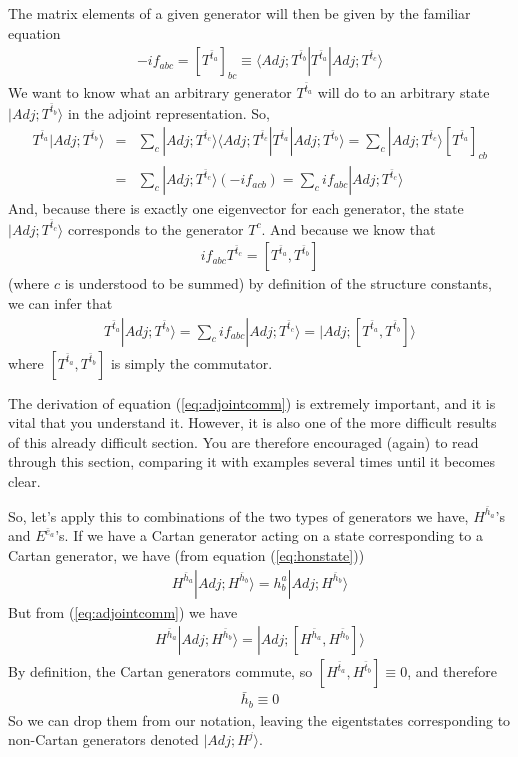 \documentclass[12pt,epsf]{article}
\def\nolabel{\nonumber }
\def\nolabel{\nonumber }
\begin{document}
The matrix elements of a given generator will then be given by the
familiar equation 
\begin{eqnarray}
-if_{abc} = [T^{\bar t_a}]_{bc} \equiv \langle Adj;T^{\bar t_b}|T^{\bar
t_a}|Adj;T^{\bar t_c}\rangle\nolabel
\end{eqnarray}
We want to know what an arbitrary generator $T^{\bar t_a}$ will do to
an arbitrary state $|Adj;T^{\bar t_b}\rangle$ in the adjoint
representation.  So,
\begin{eqnarray}
T^{\bar t_a}|Adj;T^{\bar t_b}\rangle &=& \sum_c |Adj;T^{\bar
t_c}\rangle \langle Adj; T^{\bar t_c}|T^{\bar t_a}|Adj;T^{\bar
t_b}\rangle = \sum_c|Adj;T^{\bar t_c}\rangle [T^{\bar t_a}]_{cb}
\nolabel \\
&=& \sum_c|Adj;T^{\bar t_c}\rangle (-if_{acb}) = \sum_c
if_{abc}|Adj;T^{\bar t_c}\rangle\nolabel
\end{eqnarray}
And, because there is exactly one eigenvector for each generator, the
state $|Adj;T^{\bar t_c}\rangle$ corresponds to the generator $T^c$. 
And because we know that 
\begin{eqnarray}
if_{abc}T^{\bar t_c} = [T^{\bar t_a},T^{\bar t_b}]\nolabel
\end{eqnarray}
(where $c$ is understood to be summed) by definition of the structure
constants, we can infer that
\begin{eqnarray}
T^{\bar t_a}|Adj;T^{\bar t_b}\rangle = \sum_c if_{abc}|Adj;T^{\bar
t_c}\rangle = |Adj;[T^{\bar t_a},T^{\bar t_b}]\rangle
\label{eq:adjointcomm}
\end{eqnarray}
where $[T^{\bar t_a},T^{\bar t_b}]$ is simply the commutator.  

The derivation of equation (\ref{eq:adjointcomm}) is extremely
important, and it is vital that you understand it.  However, it is also
one of the more difficult results of this already difficult section. 
You are therefore encouraged (again) to read through this section,
comparing it with examples several times until it becomes clear.  

So, let's apply this to combinations of the two types of generators we
have, $H^{\bar h_a}$'s and $E^{\bar e_a}$'s.  If we have a Cartan
generator acting on a state corresponding to a Cartan generator, we
have (from equation (\ref{eq:honstate}))
\begin{eqnarray}
H^{\bar h_a}|Adj;H^{\bar h_b}\rangle = h^a_b|Adj;H^{\bar h_b}\rangle
\nolabel
\end{eqnarray}
But from (\ref{eq:adjointcomm}) we have
\begin{eqnarray}
H^{\bar h_a}|Adj;H^{\bar h_b}\rangle = |Adj;[H^{\bar h_a},H^{\bar
h_b}]\rangle \nolabel
\end{eqnarray}
By definition, the Cartan generators commute, so $[H^{\bar
t_a},H^{\bar t_b}] \equiv 0$, and therefore
\begin{eqnarray}
\bar h_b \equiv 0 \label{eq:heqzero}
\end{eqnarray}
So we can drop them from our notation, leaving the eigentstates
corresponding to non-Cartan generators denoted $|Adj;H^j\rangle$.  
\end{document}
